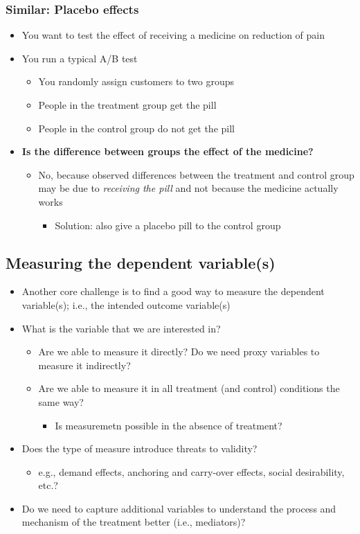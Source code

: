 \documentclass[10pt]{article}
\begin{document}
\subsubsection{Similar: Placebo effects}
\begin{itemize}
    \item You want to test the effect of receiving a medicine on reduction of pain 
    \item You run a typical A/B test 
    \begin{itemize}
        \item You randomly assign customers to two groups 
        \item People in the treatment group get the pill
        \item People in the control group do not get the pill
    \end{itemize}
    \item \textbf{Is the difference between groups the effect of the medicine?}
    \begin{itemize}
        \item No, because observed differences between the treatment and control group may be due to \textit{receiving the pill} and not because the medicine actually works
        \begin{itemize}
            \item Solution: also give a placebo pill to the control group 
        \end{itemize}
    \end{itemize}
\end{itemize}
\subsection{Measuring the dependent variable(s)}
\begin{itemize}
    \item Another core challenge is to find a good way to measure the dependent variable(s); i.e., the intended outcome variable(s)
    \item What is the variable that we are interested in?
    \begin{itemize}
        \item Are we able to measure it directly? Do we need proxy variables to measure it indirectly?
        \item Are we able to measure it in all treatment (and control) conditions the same way?
        \begin{itemize}
            \item Is measuremetn possible in the absence of treatment?
        \end{itemize}
    \end{itemize}
    \item Does the type of measure introduce threats to validity?
    \begin{itemize}
        \item e.g., demand effects, anchoring and carry-over effects, social desirability, etc.?
    \end{itemize}
    \item Do we need to capture additional variables to understand the process and mechanism of the treatment better (i.e., mediators)?
\end{itemize}
\end{document}
